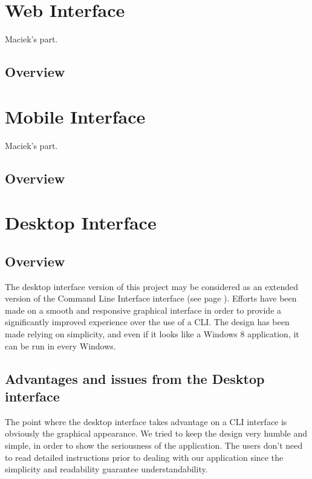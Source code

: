 \documentclass[a4paper,12pt, twocolumn]{article}
\begin{document}
\section*{Web Interface}
Maciek's part.

\subsection*{Overview}


\section*{Mobile Interface}
Maciek's part.

\subsection*{Overview}


\section*{Desktop Interface}



\subsection*{Overview}

The desktop interface version of this project may be considered as an extended version of the Command Line Interface interface (see page \pageref{cli}). Efforts have been made on a smooth and responsive graphical interface in order to provide a significantly improved experience over the use of a CLI. The design has been made relying on simplicity, and even if it looks like a Windows 8 application, it can be run in every Windows.

\subsection*{Advantages and issues from the Desktop interface}

The point where the desktop interface takes advantage on a CLI interface is obviously the graphical appearance. We tried to keep the design very humble and simple, in order to show the seriousness of the application. The users don't need to read detailed instructions prior to dealing with our application since the simplicity and readability guarantee understandability.
\end{document}

